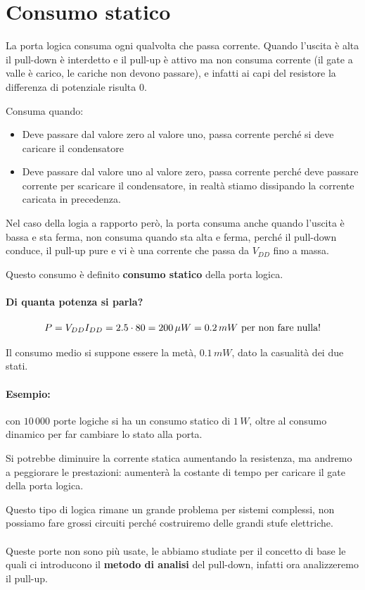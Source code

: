 \newpage
\section{Consumo	statico}

La porta logica consuma ogni qualvolta che passa corrente. Quando l'uscita è alta il pull-down è interdetto e il pull-up è attivo ma non consuma corrente (il gate a valle è carico, le cariche non devono passare), e infatti ai capi del resistore la differenza di potenziale risulta 0.

Consuma quando:

\begin{itemize}
    \item Deve passare dal valore zero al valore uno, passa corrente perché si deve caricare il condensatore
    \item Deve passare dal valore uno al valore zero, passa corrente perché deve passare corrente per scaricare il condensatore, in realtà stiamo dissipando la corrente caricata in precedenza.
\end{itemize}

Nel caso della logia a rapporto però, la porta consuma anche quando l'uscita è bassa e sta ferma, non consuma quando sta alta e ferma, perché il pull-down conduce, il pull-up pure e vi è una corrente che passa da $V_{DD}$ fino a massa. 

Questo consumo è definito \textbf{consumo statico} della porta logica.

\paragraph{Di quanta potenza si parla?}

\begin{equation*}
    P = V_{DD}I_{DD} = 2.5 \cdot80 = 200\,\mu W = 0.2\,mW \text{\,\,per non fare nulla!}
\end{equation*}

Il consumo medio si suppone essere la metà, $0.1\,mW$, dato la casualità dei due stati. 

\paragraph{Esempio:} con $10\,000$ porte logiche si ha un consumo statico di $1\,W$, oltre al consumo dinamico per far cambiare lo stato alla porta.

Si potrebbe diminuire la corrente statica aumentando la resistenza, ma andremo a peggiorare le prestazioni: aumenterà la costante di tempo per caricare il gate della porta logica.

Questo tipo di logica rimane un grande problema per sistemi complessi, non possiamo fare grossi circuiti perché costruiremo delle grandi stufe elettriche.

\paragraph{}
Queste porte non sono più usate, le abbiamo studiate per il concetto di base le quali ci introducono il \textbf{metodo di analisi} del pull-down, infatti ora analizzeremo il pull-up.

